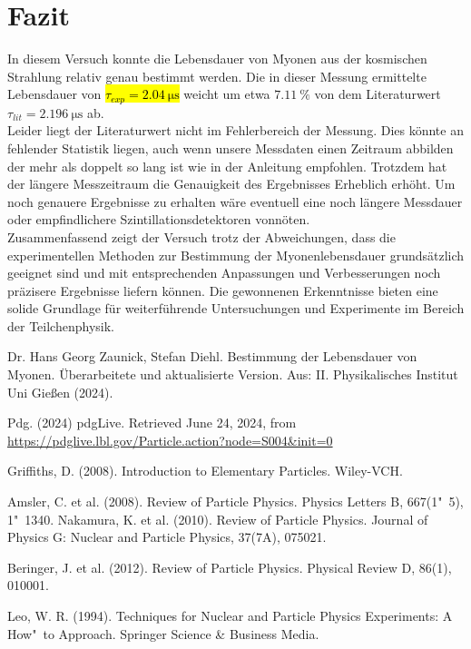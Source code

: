 \documentclass[12pt,a4paper,ngerman]{report}
\newcommand{\highlight}[1]{%
	\colorbox{yellow!50}{$\displaystyle#1$}} %
\begin{document}
\chapter{Fazit}
	In diesem Versuch konnte die Lebensdauer von Myonen aus der kosmischen Strahlung relativ genau bestimmt werden. Die in dieser Messung ermittelte Lebensdauer von \hl{$\tau_{exp}=\qty{2.04}{\micro\s}$} weicht um etwa \highlight{\qty{7.11}{\percent}} von dem Literaturwert $\tau_{lit}=\qty{2.196}{\micro\s}$ ab.\\
	Leider liegt der Literaturwert nicht im Fehlerbereich der Messung. Dies könnte an fehlender Statistik liegen, auch wenn unsere Messdaten einen Zeitraum abbilden der mehr als doppelt so lang ist wie in der Anleitung \cite{Anleitung} empfohlen. Trotzdem hat der längere Messzeitraum die Genauigkeit des Ergebnisses Erheblich erhöht. Um noch genauere Ergebnisse zu erhalten wäre eventuell eine noch längere Messdauer oder empfindlichere Szintillationsdetektoren vonnöten. \\
	
	Zusammenfassend zeigt der Versuch trotz der Abweichungen, dass die experimentellen Methoden zur Bestimmung der Myonenlebensdauer grundsätzlich geeignet sind und mit entsprechenden Anpassungen und Verbesserungen noch präzisere Ergebnisse liefern können. Die gewonnenen Erkenntnisse bieten eine solide Grundlage für weiterführende Untersuchungen und Experimente im Bereich der Teilchenphysik.
	

	\listoffigures
	
	\begin{thebibliography}{111} %
		Dr. Hans Georg Zaunick, Stefan Diehl. \glqq Bestimmung der Lebensdauer von Myonen\grqq. Überarbeitete und aktualisierte Version. Aus: II. Physikalisches Institut
		Uni Gießen (2024).
		
		Pdg. (2024) pdgLive. Retrieved June 24, 2024, from \url{https://pdglive.lbl.gov/Particle.action?node=S004&init=0}

		Griffiths, D. (2008). Introduction to Elementary Particles. Wiley-VCH.

		Amsler, C. et al. (2008). Review of Particle Physics. Physics Letters B, 667(1"~5), 1"~1340.
		Nakamura, K. et al. (2010). Review of Particle Physics. Journal of Physics G: Nuclear and Particle Physics, 37(7A), 075021.

		Beringer, J. et al. (2012). Review of Particle Physics. Physical Review D, 86(1), 010001.

		Leo, W. R. (1994). Techniques for Nuclear and Particle Physics Experiments: A How"~to Approach. Springer Science \& Business Media.
		
		
		
	\end{thebibliography}
\end{document}
